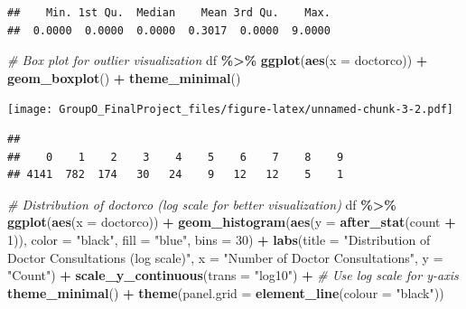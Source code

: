 \documentclass[
]{article}
\newenvironment{Shaded}{\begin{snugshade}}{\end{snugshade}}
\newcommand{\AttributeTok}[1]{\textcolor[rgb]{0.13,0.29,0.53}{#1}}
\newcommand{\CommentTok}[1]{\textcolor[rgb]{0.56,0.35,0.01}{\textit{#1}}}
\newcommand{\DecValTok}[1]{\textcolor[rgb]{0.00,0.00,0.81}{#1}}
\newcommand{\FunctionTok}[1]{\textcolor[rgb]{0.13,0.29,0.53}{\textbf{#1}}}
\newcommand{\NormalTok}[1]{#1}
\newcommand{\SpecialCharTok}[1]{\textcolor[rgb]{0.81,0.36,0.00}{\textbf{#1}}}
\newcommand{\StringTok}[1]{\textcolor[rgb]{0.31,0.60,0.02}{#1}}
\begin{document}
\begin{verbatim}
##    Min. 1st Qu.  Median    Mean 3rd Qu.    Max. 
##  0.0000  0.0000  0.0000  0.3017  0.0000  9.0000
\end{verbatim}

\begin{Shaded}
\begin{Highlighting}[]
\CommentTok{\# Box plot for outlier visualization}
\NormalTok{df }\SpecialCharTok{\%\textgreater{}\%}
  \FunctionTok{ggplot}\NormalTok{(}\FunctionTok{aes}\NormalTok{(}\AttributeTok{x =}\NormalTok{ doctorco)) }\SpecialCharTok{+}
  \FunctionTok{geom\_boxplot}\NormalTok{() }\SpecialCharTok{+}
  \FunctionTok{theme\_minimal}\NormalTok{()}
\end{Highlighting}
\end{Shaded}

\texttt{[image: GroupO\_FinalProject\_files/figure-latex/unnamed-chunk-3-2.pdf]}

\begin{Shaded}
\end{Shaded}

\begin{verbatim}
## 
##    0    1    2    3    4    5    6    7    8    9 
## 4141  782  174   30   24    9   12   12    5    1
\end{verbatim}

\begin{Shaded}
\begin{Highlighting}[]
\CommentTok{\# Distribution of \textquotesingle{}doctorco\textquotesingle{} (log scale for better visualization)}
\NormalTok{df }\SpecialCharTok{\%\textgreater{}\%}
  \FunctionTok{ggplot}\NormalTok{(}\FunctionTok{aes}\NormalTok{(}\AttributeTok{x =}\NormalTok{ doctorco)) }\SpecialCharTok{+}
  \FunctionTok{geom\_histogram}\NormalTok{(}\FunctionTok{aes}\NormalTok{(}\AttributeTok{y =} \FunctionTok{after\_stat}\NormalTok{(count }\SpecialCharTok{+} \DecValTok{1}\NormalTok{)), }\AttributeTok{color =} \StringTok{"black"}\NormalTok{, }\AttributeTok{fill =} \StringTok{"blue"}\NormalTok{, }\AttributeTok{bins =} \DecValTok{30}\NormalTok{) }\SpecialCharTok{+}
  \FunctionTok{labs}\NormalTok{(}\AttributeTok{title =} \StringTok{"Distribution of Doctor Consultations (log scale)"}\NormalTok{,}
       \AttributeTok{x =} \StringTok{"Number of Doctor Consultations"}\NormalTok{,}
       \AttributeTok{y =} \StringTok{"Count"}\NormalTok{) }\SpecialCharTok{+}
  \FunctionTok{scale\_y\_continuous}\NormalTok{(}\AttributeTok{trans =} \StringTok{"log10"}\NormalTok{) }\SpecialCharTok{+}  \CommentTok{\# Use log scale for y{-}axis}
  \FunctionTok{theme\_minimal}\NormalTok{() }\SpecialCharTok{+}
  \FunctionTok{theme}\NormalTok{(}\AttributeTok{panel.grid =} \FunctionTok{element\_line}\NormalTok{(}\AttributeTok{colour =} \StringTok{"black"}\NormalTok{))}
\end{Highlighting}
\end{Shaded}
\end{document}
